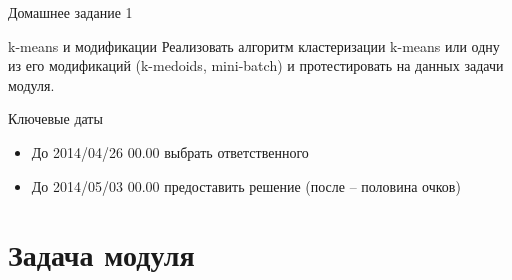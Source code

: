 \documentclass[10pt,a4paper]{beamer}
\begin{document}

\begin{frame}{Домашнее задание 1}

\begin{block}{k-means и модификации}
Реализовать алгоритм кластеризации k-means или одну из его модификаций (k-medoids, mini-batch) и протестировать на данных задачи модуля.
\end{block}

\vspace{1em}
Ключевые даты
\begin{itemize}
\item До 2014/04/26 00.00 выбрать ответственного
\item До 2014/05/03 00.00 предоставить решение (после -- половина очков)
\end{itemize}

\end{frame}


\section{Задача модуля}

\end{document}
